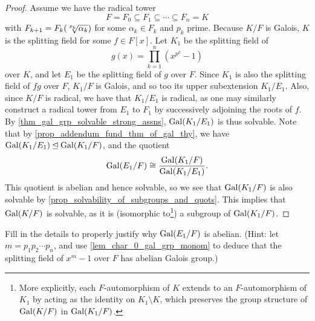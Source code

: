 \begin{proof}
    Assume we have the radical tower
    \[
        F = F_0 \subseteq F_1 \subseteq \cdots \subseteq F_n = K
    \]
    with $F_{k + 1} = F_k(\sqrt[\uproot{3} p_k]{\alpha_k})$ for some $\alpha_k \in F_k$ and $p_k$ prime. Because $K/F$ is Galois, $K$ is the splitting field for some $f \in F[x]$. Let $K_1$ be the splitting field of
    \[
        g(x) = \prod_{k = 1}^{n} (x^{p^k} - 1)
    \]
    over $K$, and let $E_1$ be the splitting field of $g$ over $F$.
    Since $K_1$ is also the splitting field of $fg$ over $F$, $K_1/F$ is Galois, and so too its upper subextension $K_1/E_1$. Also, since $K/F$ is radical, we have that $K_1/E_1$ is radical, as one may similarly construct a radical tower from $E_1$ to $F_1$ by successively adjoining the roots of $f$. By \cref{thm_gal_grp_solvable_strong_assns}, $\operatorname{Gal}(K_1/E_1)$ is thus solvable. Note that by \cref{prop_addendum_fund_thm_of_gal_thy}, we have $\operatorname{Gal}(K_1/E_1) \unlhd \operatorname{Gal}(K_1/F)$, and the quotient
    \[
        \operatorname{Gal}(E_1/F) \cong \frac{\operatorname{Gal}(K_1/F)}{\operatorname{Gal}(K_1/E_1)}.
    \]
    This quotient is abelian and hence solvable, so we see that $\operatorname{Gal}(K_1/F)$ is also solvable by \cref{prop_solvability_of_subgroups_and_quots}. This implies that $\operatorname{Gal}(K/F)$ is solvable, as it is (isomorphic to\footnote{More explicitly, each $F$-automorphism of $K$ extends to an $F$-automorphism of $K_1$ by acting as the identity on $K_1 \setminus K$, which preserves the group structure of $\operatorname{Gal}(K/F)$ in $\operatorname{Gal}(K_1/F)$.}) a subgroup of $\operatorname{Gal}(K_1/F)$.
\end{proof}

\begin{exercise}
    Fill in the details to properly justify why $\operatorname{Gal}(E_1/F)$ is abelian. (Hint: let $m = p_1 p_2 \cdots p_n$, and use \cref{lem_char_0_gal_grp_monom} to deduce that the splitting field of $x^m - 1$ over $F$ has abelian Galois group.)
\end{exercise}

